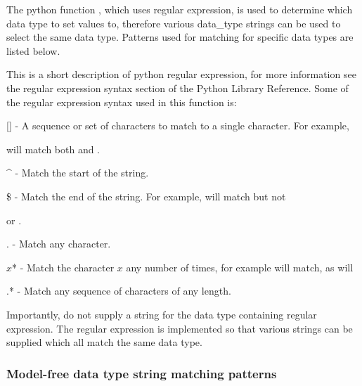 The python function 
, which uses regular expression, is used to determine which data
type to set values to, therefore various data\_type strings can be used to select the same
data type.  Patterns used for matching for specific data types are listed below.

This is a short description of python regular expression, for more information see the
regular expression syntax section of the Python Library Reference.  Some of the regular
expression syntax used in this function is:

    [] - A sequence or set of characters to match to a single character.  For example,
    
 will match both 
 and 
.

    \^{} - Match the start of the string.

    \$ - Match the end of the string.  For example, 
 will match 
 but not 

    or 
.

    . - Match any character.

    $x$* - Match the character $x$ any number of times, for example 
 will match, as will
    


    .* - Match any sequence of characters of any length.

Importantly, do not supply a string for the data type containing regular expression.  The
regular expression is implemented so that various strings can be supplied which all match
the same data type.


\subsubsection{Model-free data type string matching patterns}




